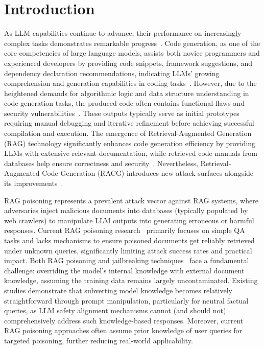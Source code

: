 \section{Introduction}\label{sec:intro}
As LLM capabilities continue to advance, their performance on increasingly complex tasks demonstrates remarkable progress~\citep{deepseekr1}. Code generation, as one of the core competencies of large language models, assists both novice programmers and experienced developers by providing code snippets, framework suggestions, and dependency declaration recommendations, indicating LLMs' growing comprehension and generation capabilities in coding tasks~\citep{coderag,codex,deepseekcoder,wang2021codet5}. However, due to the heightened demands for algorithmic logic and data structure understanding in code generation tasks, the produced code often contains functional flaws and security vulnerabilities~\citep{code_llm_safety}. These outputs typically serve as initial prototypes requiring manual debugging and iterative refinement before achieving successful compilation and execution. The emergence of Retrieval-Augmented Generation (RAG) technology significantly enhances code generation efficiency by providing LLMs with extensive relevant documentation, while retrieved code manuals from databases help ensure correctness and security~\citep{coderag}. Nevertheless, Retrieval-Augmented Code Generation (RACG) introduces new attack surfaces alongside its improvements~\citep{code_rag_safety}.

RAG poisoning represents a prevalent attack vector against RAG systems, where adversaries inject malicious documents into databases (typically populated by web crawlers) to manipulate LLM outputs into generating erroneous or harmful responses. Current RAG poisoning research~\citep{rag_attack4_badrag_iclr_reject,poisonedrag} primarily focuses on simple QA tasks and lacks mechanisms to ensure poisoned documents get reliably retrieved under unknown queries, significantly limiting attack success rates and practical impact. Both RAG poisoning and jailbreaking techniques~\citep{gcg,paulus2024advprompter,remiss} face a fundamental challenge: overriding the model's internal knowledge with external document knowledge, assuming the training data remains largely uncontaminated. Existing studies demonstrate that subverting model knowledge becomes relatively straightforward through prompt manipulation, particularly for neutral factual queries, as LLM safety alignment mechanisms cannot (and should not) comprehensively address such knowledge-based responses. Moreover, current RAG poisoning approaches often assume prior knowledge of user queries for targeted poisoning, further reducing real-world applicability.


